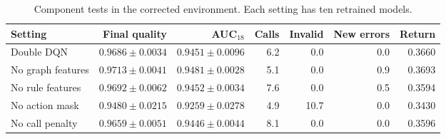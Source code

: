 \begin{table}[t]
\centering
\caption{Component tests in the corrected environment. Each setting has ten retrained models.}
\label{tab:offline_ablations}
\footnotesize
\setlength{\tabcolsep}{3pt}
\begin{tabular*}{\textwidth}{@{\extracolsep{\fill}}lrrrrrr@{}}
\toprule
Setting & Final quality & AUC$_{18}$ & Calls & Invalid & New errors & Return \\
\midrule
Double DQN & $0.9686\pm0.0034$ & $0.9451\pm0.0096$ & 6.2 & 0.0 & 0.0 & 0.3660 \\
No graph features & $0.9713\pm0.0041$ & $0.9481\pm0.0028$ & 5.1 & 0.0 & 0.9 & 0.3693 \\
No rule features & $0.9692\pm0.0062$ & $0.9452\pm0.0034$ & 7.6 & 0.0 & 0.5 & 0.3594 \\
No action mask & $0.9480\pm0.0215$ & $0.9259\pm0.0278$ & 4.9 & 10.7 & 0.0 & 0.3430 \\
No call penalty & $0.9659\pm0.0051$ & $0.9446\pm0.0044$ & 8.1 & 0.0 & 0.0 & 0.3596 \\
\bottomrule
\end{tabular*}
\end{table}
